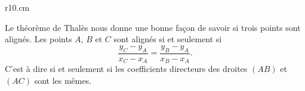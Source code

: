 \begin{wrapfigure}{r}{10.cm}
   \vspace{-0.5cm}        %
   \centering
   
\end{wrapfigure}


Le théorème de Thalès nous donne une bonne façon de savoir si trois points sont alignés. Les points \( A\), \( B\) et \( C\) sont alignés si et seulement si
\begin{equation}
    \frac{ y_C-y_A }{ x_C-x_A }=\frac{ y_B-y_A }{ x_B-x_A }.
\end{equation}
C'est à dire si et seulement si les coefficients directeurs des droites \( (AB)\) et \( (AC)\) sont les mêmes.
